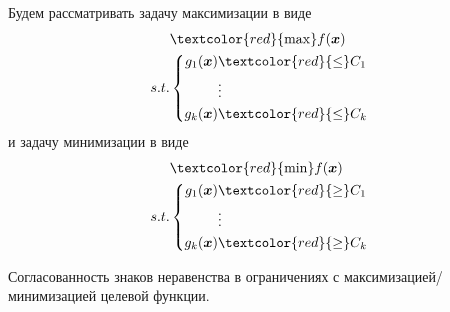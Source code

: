 Будем рассматривать задачу максимизации в виде
\begin{equation}\label{MaxInequalityConstraintOptmization}
	\begin{aligned} & \textcolor{red}{\max}  f(\vectx) \\ 
		s.t. & 
		\left\{\begin{aligned} g_1(\vectx) & \textcolor{red}{\leq} C_1 \\ 
		& \vdots \\ 
		g_k(\vectx) & \textcolor{red}{\leq} C_k \end{aligned}\right.
	\end{aligned} 
\end{equation}
и задачу минимизации в виде
\begin{equation}\label{MinInequalityConstraintOptmization}
	\begin{aligned} & \textcolor{red}{\min}  f(\vectx) \\ 
		 s.t. & 
		 \left\{\begin{aligned} g_1(\vectx) & \textcolor{red}{\geq} C_1 \\ 
		 & \vdots \\ 
		 g_k(\vectx) & \textcolor{red}{\geq} C_k \end{aligned}\right.
	 \end{aligned} 
\end{equation}

\begin{importante}
Согласованность знаков неравенства в ограничениях с максимизацией/минимизацией
целевой функции.
\end{importante}

